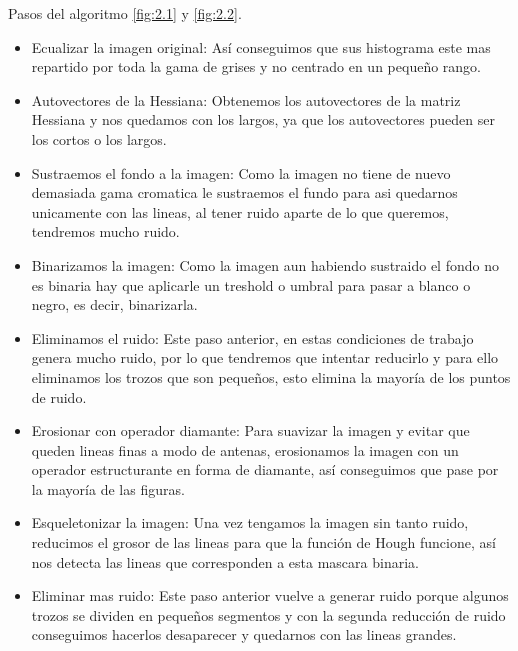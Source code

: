 Pasos del algoritmo \ref{fig:2.1} y \ref{fig:2.2}.
\begin{itemize}
	\item Ecualizar la imagen original:
Así conseguimos que sus histograma este mas repartido por toda la gama de grises y no centrado en un pequeño rango.
	\item Autovectores de la Hessiana:
Obtenemos los autovectores de la matriz Hessiana y nos quedamos con los largos, ya que los autovectores pueden ser los cortos o los largos. 
	\item Sustraemos el fondo a la imagen:
Como la imagen no tiene de nuevo demasiada gama cromatica le sustraemos el fundo para asi quedarnos unicamente con las lineas, al tener ruido aparte de lo que queremos, tendremos mucho ruido.
	\item Binarizamos la imagen:
Como la imagen aun habiendo sustraido el fondo no es binaria hay que aplicarle un treshold o umbral para pasar a blanco o negro, es decir, binarizarla.
	\item Eliminamos el ruido:
Este paso anterior, en estas condiciones de trabajo genera mucho ruido, por lo que tendremos que intentar reducirlo y para ello eliminamos los trozos que son pequeños, esto elimina la mayoría de los puntos de ruido.
	\item Erosionar con operador diamante:
Para suavizar la imagen y evitar que queden lineas finas a modo de antenas, erosionamos la imagen con un operador estructurante en forma de diamante, así conseguimos que pase por la mayoría de las figuras.
	\item Esqueletonizar la imagen:
Una vez tengamos la imagen sin tanto ruido, reducimos el grosor de las lineas para que la función de Hough funcione, así nos detecta las lineas que corresponden a esta mascara binaria.
	\item Eliminar mas ruido:
Este paso anterior vuelve a generar ruido porque algunos trozos se dividen en pequeños segmentos y con la segunda reducción de ruido conseguimos hacerlos desaparecer y quedarnos con las lineas grandes.
\end{itemize}



